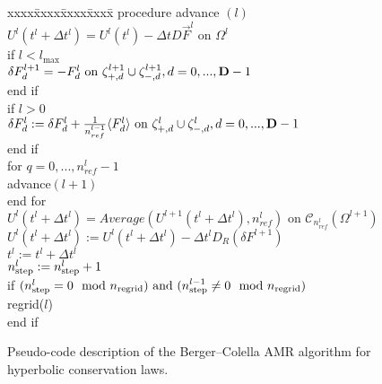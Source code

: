 \begin{figure}[thp]
\hrulefill
\begin{tabbing} 
xxxx\=xxxx\=xxxx\=xxxx\=\kill
\>procedure advance $(l)$ \\
\>$U^l(t^l + \Delta t^l) = U^l(t^l) - \Delta t D \vec{F}^l \mbox{ on }
\Omega^l$ \\
\>if $l<l_{\max}$ \\
\>\>$\delta F^{l+1}_d = -F^l_d \mbox{ on }
{\zeta}^{l+1}_{+,d} \cup {\zeta}^{l+1}_{-,d} , d=0, ..., {\mathbf{D}}-1$ \\
\> end if \\
\>if $l>0$ \\
\>\> $\delta F^l_d := \delta F^l_d + \frac{1}{n^{l-1}_{ref}}\langle F^l_d \rangle \mbox{ on }
{\zeta}^l_{+,d} \cup {\zeta}^l_{-,d} , d=0, ..., {\mathbf{D}}-1$  \\
\> end if \\
\>for $q = 0, ..., n^l_{ref} -1$ \\
\>\> advance$(l+1)$ \\
\> end for \\
\>$U^l(t^l + \Delta t^l) = Average(U^{l+1}(t^l + \Delta t^l), n^l_{ref})
\mbox{ on } {\mathcal{C}}_{n^l_{ref}} (\Omega^{l+1})$ \\
\>$U^l(t^l + \Delta t^l) := U^l(t^l + \Delta t^l) - \Delta t^l D_R
(\delta F^{l+1})$ \\
\>$t^l := t^l + \Delta t^l$ \\
\>$n^l_{\rm step} := n^l_{\rm step}+ 1$ \\
\>if $(n^l_{\rm step} = 0 \mod n_{\rm regrid}) \mbox{ and } (n^{l-1}_{\rm step} \neq 0 \mod n_{\rm regrid}) $\\
\>\>regrid($l$) \\
\> end if
\end{tabbing}
\hrulefill
\caption{Pseudo-code description of the Berger--Colella AMR algorithm for 
hyperbolic conservation laws.}
\label{fig:HSCLcode}
\end{figure}



